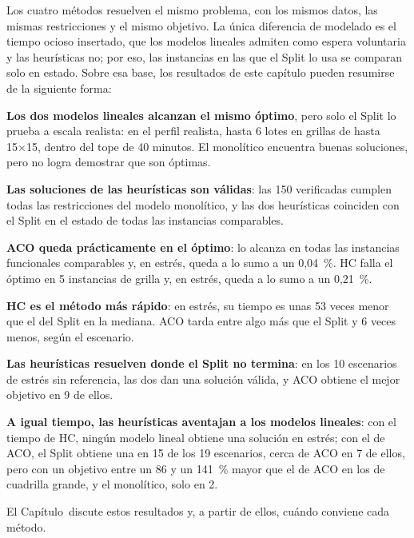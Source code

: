 \stopsubsection

\stopsection

\startsection[title={Síntesis de los resultados}, reference=sec:sintesis_resultados]

Los cuatro métodos resuelven el mismo problema, con los mismos datos, las
mismas restricciones y el mismo objetivo. La única diferencia de modelado es
el tiempo ocioso insertado, que los modelos lineales admiten como espera
voluntaria y las heurísticas no; por eso, las instancias en las que el Split
lo usa se comparan solo en estado. Sobre esa base, los resultados de este
capítulo pueden resumirse de la siguiente forma:
\startitemize
	\item {\bf Los dos modelos lineales alcanzan el mismo óptimo}, pero solo el
	Split lo prueba a escala realista: en el perfil realista, hasta 6 lotes en
	grillas de hasta 15×15, dentro del tope de 40 minutos. El monolítico
	encuentra buenas soluciones, pero no logra demostrar que son óptimas.
	\item {\bf Las soluciones de las heurísticas son válidas}: las 150
	verificadas cumplen todas las restricciones del modelo monolítico, y las dos
	heurísticas coinciden con el Split en el estado de todas las instancias
	comparables.
	\item {\bf ACO queda prácticamente en el óptimo}: lo alcanza en todas las
	instancias funcionales comparables y, en estrés, queda a lo sumo a un
	0,04~\%. HC falla el óptimo en 5 instancias de grilla y, en estrés, queda a
	lo sumo a un 0,21~\%.
	\item {\bf HC es el método más rápido}: en estrés, su tiempo es unas 53
	veces menor que el del Split en la mediana. ACO tarda entre algo más que el
	Split y 6 veces menos, según el escenario.
	\item {\bf Las heurísticas resuelven donde el Split no termina}: en los 10
	escenarios de estrés sin referencia, las dos dan una solución válida, y ACO
	obtiene el mejor objetivo en 9 de ellos.
	\item {\bf A igual tiempo, las heurísticas aventajan a los modelos lineales}:
	con el tiempo de HC, ningún modelo lineal obtiene una solución en estrés;
	con el de ACO, el Split obtiene una en 15 de los 19 escenarios, cerca de
	ACO en 7 de ellos, pero con un objetivo entre un 86 y un 141~\% mayor que
	el de ACO en los de cuadrilla grande, y el monolítico, solo en 2.
\stopitemize

El Capítulo~\in[Capitulo_7] discute estos resultados y, a partir de ellos,
cuándo conviene cada método.

\stopsection
\stopchapter
